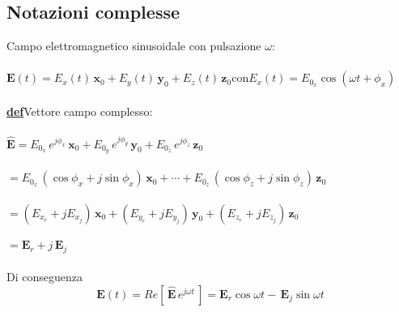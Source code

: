 \documentclass[a4paper]{article}
\begin{document}
\subsection*{Notazioni complesse}
Campo elettromagnetico sinusoidale con pulsazione $\omega$:\\\\
$\textbf{E}(t)=E_x(t)\,\textbf{x}_0+E_y(t)\,\textbf{y}_0+E_z(t)\,\textbf{z}_0$\hspace{10mm}con\hspace{5mm}$E_x(t)=E_{0_x}\cos(\omega t+\phi_x)$\\\\
\underline{\textbf{def}}\hspace{4mm}Vettore campo complesso:\\\\
\hspace*{10mm}$\hat{\textbf{E}}=E_{0_x}\,e^{j\phi_x}\,\textbf{x}_0+E_{0_y}\,e^{j\phi_y}\,\textbf{y}_0+E_{0_z}\,e^{j\phi_z}\,\textbf{z}_0$\\\\
\hspace*{10mm}$=E_{0_x}\,(\cos\phi_x+j\sin\phi_x)\,\textbf{x}_0+\cdots+E_{0_z}\,(\cos\phi_z+j\sin\phi_z)\,\textbf{z}_0$\\\\
\hspace*{10mm}$=(E_{x_r}+jE_{x_j})\,\textbf{x}_0+(E_{y_r}+jE_{y_j})\,\textbf{y}_0+(E_{z_r}+jE_{z_j})\,\textbf{z}_0$\\\\
\hspace*{10mm}$=\textbf{E}_r+j\,\textbf{E}_j$\\\\
Di conseguenza
\begin{equation*}
\textbf{E}(t)=Re[\,\hat{\textbf{E}}\,e^{j\omega t}\,]=\textbf{E}_r\cos\omega t-\,\textbf{E}_j\sin\omega t
\end{equation*}
\end{document}
